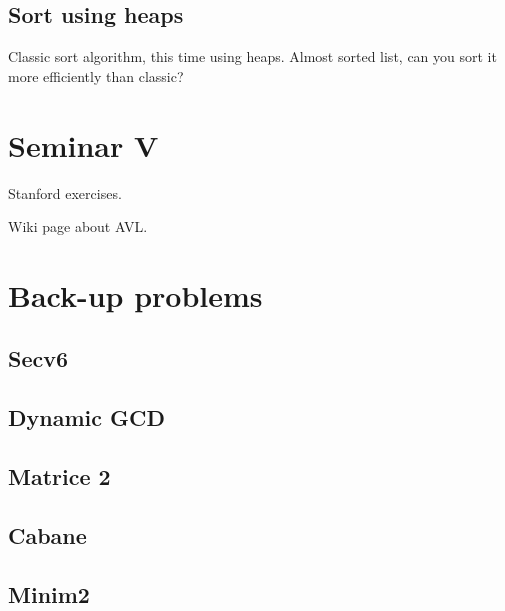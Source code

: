 \documentclass{llncs}
\begin{document}
\subsection{Sort using heaps}
Classic sort algorithm, this time using heaps. Almost sorted list, can you sort it more efficiently than classic?


\section{Seminar V}

Stanford exercises. \cite{website:stanford/binarytrees}

Wiki page about AVL. \cite{website:wiki:avl}
%
%
%

\section{Back-up problems}

\subsection{Secv6 \cite{website:infoarena/secv6}}
\subsection{Dynamic GCD \cite{website:timus/gcd}}
\subsection{Matrice 2 \cite{website:infoarena/matrice2}}
\subsection{Cabane \cite{website:infoarena/cabane}}
\subsection{Minim2 \cite{website:infoarena/minim2}}


\clearpage


\end{document}

